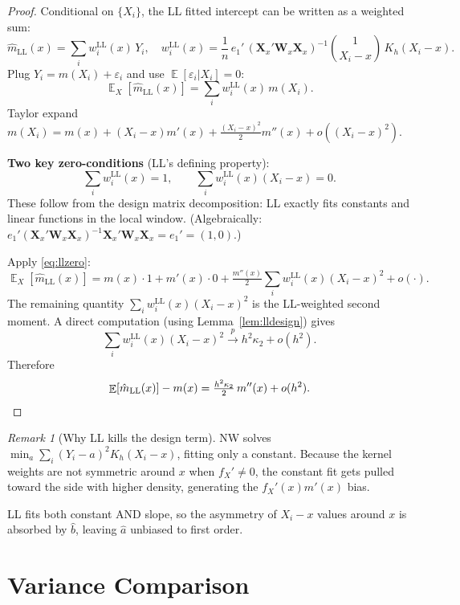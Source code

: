 \documentclass[11pt]{article}
\theoremstyle{plain}
\theoremstyle{definition}
\theoremstyle{remark}
\newtheorem*{remark}{Remark}
\DeclareMathOperator{\E}{\mathbb{E}}
\begin{document}
\begin{proof}
Conditional on $\{X_i\}$, the LL fitted intercept can be written as a weighted
sum:
\[
\hat m_{\text{LL}}(x) = \sum_i w_i^{\text{LL}}(x)\, Y_i,
\quad w_i^{\text{LL}}(x) = \frac{1}{n}\, e_1'\,(\mathbf{X}_x'\mathbf{W}_x\mathbf{X}_x)^{-1}
\binom{1}{X_i - x}\, K_h(X_i - x).
\]
Plug $Y_i = m(X_i) + \varepsilon_i$ and use $\E[\varepsilon_i|X_i] = 0$:
\[
\E_X[\hat m_{\text{LL}}(x)] = \sum_i w_i^{\text{LL}}(x)\, m(X_i).
\]
Taylor expand $m(X_i) = m(x) + (X_i - x) m'(x) + \tfrac{(X_i - x)^2}{2} m''(x) + o((X_i-x)^2)$.

\textbf{Two key zero-conditions} (LL's defining property):
\begin{equation}\label{eq:llzero}
\sum_i w_i^{\text{LL}}(x) = 1, \qquad \sum_i w_i^{\text{LL}}(x) (X_i - x) = 0.
\end{equation}
These follow from the design matrix decomposition: LL exactly fits constants
and linear functions in the local window. (Algebraically:
$e_1'(\mathbf{X}_x'\mathbf{W}_x\mathbf{X}_x)^{-1}\mathbf{X}_x'\mathbf{W}_x \mathbf{X}_x = e_1' = (1, 0)$.)

Apply \eqref{eq:llzero}:
\[
\E_X[\hat m_{\text{LL}}(x)] = m(x) \cdot 1 + m'(x) \cdot 0
  + \tfrac{m''(x)}{2}\sum_i w_i^{\text{LL}}(x)(X_i - x)^2 + o(\cdot).
\]
The remaining quantity $\sum_i w_i^{\text{LL}}(x)(X_i - x)^2$ is the
LL-weighted second moment. A direct computation (using
Lemma~\ref{lem:lldesign}) gives
\[
\sum_i w_i^{\text{LL}}(x)(X_i - x)^2 \xrightarrow{p} h^2 \kappa_2 + o(h^2).
\]
Therefore
\[
\E[\hat m_{\text{LL}}(x)] - m(x) = \tfrac{h^2 \kappa_2}{2}\, m''(x) + o(h^2). \qedhere
\]
\end{proof}

\begin{remark}[Why LL kills the design term]
NW solves $\min_a \sum_i (Y_i - a)^2 K_h(X_i - x)$, fitting only a constant.
Because the kernel weights are not symmetric around $x$ when $f_X' \neq 0$,
the constant fit gets pulled toward the side with higher density, generating
the $f_X'(x) m'(x)$ bias.

LL fits both constant AND slope, so the asymmetry of $X_i - x$ values around $x$
is absorbed by $\hat b$, leaving $\hat a$ unbiased to first order.
\end{remark}

\section{Variance Comparison}\label{sec:var}
\end{document}
